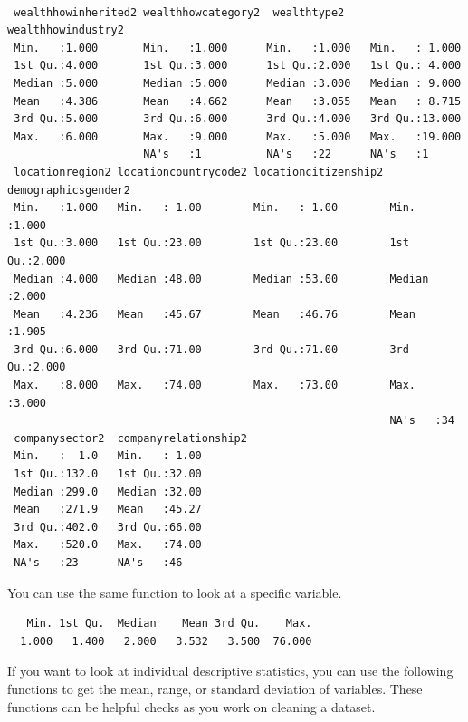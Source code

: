 \documentclass[
]{book}
\newenvironment{Shaded}{\begin{snugshade}}{\end{snugshade}}
\newcommand{\FunctionTok}[1]{\textcolor[rgb]{0.00,0.00,0.00}{#1}}
\newcommand{\NormalTok}[1]{#1}
\newcommand{\SpecialCharTok}[1]{\textcolor[rgb]{0.00,0.00,0.00}{#1}}
\begin{document}
\begin{verbatim}
                                                                
 wealthhowinherited2 wealthhowcategory2  wealthtype2    wealthhowindustry2
 Min.   :1.000       Min.   :1.000      Min.   :1.000   Min.   : 1.000    
 1st Qu.:4.000       1st Qu.:3.000      1st Qu.:2.000   1st Qu.: 4.000    
 Median :5.000       Median :5.000      Median :3.000   Median : 9.000    
 Mean   :4.386       Mean   :4.662      Mean   :3.055   Mean   : 8.715    
 3rd Qu.:5.000       3rd Qu.:6.000      3rd Qu.:4.000   3rd Qu.:13.000    
 Max.   :6.000       Max.   :9.000      Max.   :5.000   Max.   :19.000    
                     NA's   :1          NA's   :22      NA's   :1         
 locationregion2 locationcountrycode2 locationcitizenship2 demographicsgender2
 Min.   :1.000   Min.   : 1.00        Min.   : 1.00        Min.   :1.000      
 1st Qu.:3.000   1st Qu.:23.00        1st Qu.:23.00        1st Qu.:2.000      
 Median :4.000   Median :48.00        Median :53.00        Median :2.000      
 Mean   :4.236   Mean   :45.67        Mean   :46.76        Mean   :1.905      
 3rd Qu.:6.000   3rd Qu.:71.00        3rd Qu.:71.00        3rd Qu.:2.000      
 Max.   :8.000   Max.   :74.00        Max.   :73.00        Max.   :3.000      
                                                           NA's   :34         
 companysector2  companyrelationship2
 Min.   :  1.0   Min.   : 1.00       
 1st Qu.:132.0   1st Qu.:32.00       
 Median :299.0   Median :32.00       
 Mean   :271.9   Mean   :45.27       
 3rd Qu.:402.0   3rd Qu.:66.00       
 Max.   :520.0   Max.   :74.00       
 NA's   :23      NA's   :46          
\end{verbatim}

You can use the same function to look at a specific variable.

\begin{Shaded}
\end{Shaded}

\begin{verbatim}
   Min. 1st Qu.  Median    Mean 3rd Qu.    Max. 
  1.000   1.400   2.000   3.532   3.500  76.000 
\end{verbatim}

If you want to look at individual descriptive statistics, you can use the following functions to get the mean, range, or standard deviation of variables. These functions can be helpful checks as you work on cleaning a dataset.
\end{document}
